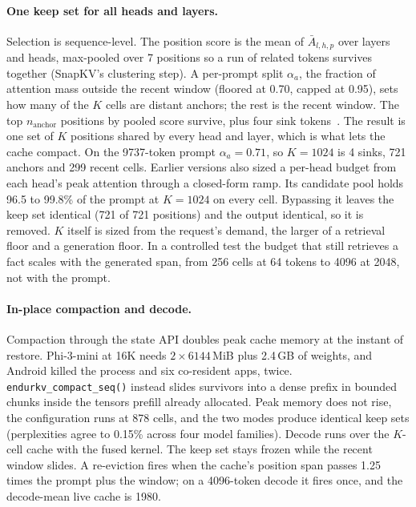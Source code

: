 \documentclass[sigconf, anonymous=false, screen=true, 10pt]{acmart}
\begin{document}
\paragraph{One keep set for all heads and layers.} Selection is sequence-level. The position score is the mean of $\bar A_{l,h,p}$ over layers and heads, max-pooled over 7 positions so a run of related tokens survives together (SnapKV's clustering step). A per-prompt split $\alpha_a$, the fraction of attention mass outside the recent window (floored at 0.70, capped at 0.95), sets how many of the $K$ cells are distant anchors; the rest is the recent window. The top $n_\mathrm{anchor}$ positions by pooled score survive, plus four sink tokens~\cite{xiao2024streamingllm}. The result is one set of $K$ positions shared by every head and layer, which is what lets the cache compact. On the 9737-token prompt $\alpha_a = 0.71$, so $K{=}1024$ is 4 sinks, 721 anchors and 299 recent cells. Earlier versions also sized a per-head budget from each head's peak attention through a closed-form ramp. Its candidate pool holds 96.5 to 99.8\% of the prompt at $K{=}1024$ on every cell. Bypassing it leaves the keep set identical (721 of 721 positions) and the output identical, so it is removed. $K$ itself is sized from the request's demand, the larger of a retrieval floor and a generation floor. In a controlled test the budget that still retrieves a fact scales with the generated span, from 256 cells at 64 tokens to 4096 at 2048, not with the prompt.

\paragraph{In-place compaction and decode.} Compaction through the state API doubles peak cache memory at the instant of restore. Phi-3-mini at 16K needs $2\times6144$\,MiB plus 2.4\,GB of weights, and Android killed the process and six co-resident apps, twice. \texttt{endurkv\_compact\_seq()} instead slides survivors into a dense prefix in bounded chunks inside the tensors prefill already allocated. Peak memory does not rise, the configuration runs at 878 cells, and the two modes produce identical keep sets (perplexities agree to 0.15\% across four model families). Decode runs over the $K$-cell cache with the fused kernel. The keep set stays frozen while the recent window slides. A re-eviction fires when the cache's position span passes 1.25 times the prompt plus the window; on a 4096-token decode it fires once, and the decode-mean live cache is 1980.
\end{document}
